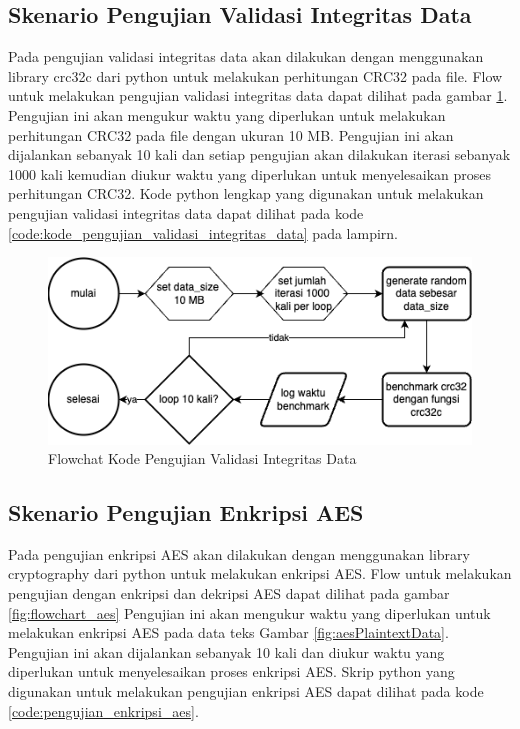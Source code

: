 \subsection{Skenario Pengujian Validasi Integritas Data}
Pada pengujian validasi integritas data akan dilakukan dengan menggunakan library crc32c dari python untuk melakukan perhitungan CRC32 pada file. Flow untuk melakukan pengujian validasi integritas data dapat dilihat pada gambar \ref{fig:flowchart_crc32}. Pengujian ini akan mengukur waktu yang diperlukan untuk melakukan perhitungan CRC32 pada file dengan ukuran 10 MB. Pengujian ini akan dijalankan sebanyak 10 kali dan setiap pengujian akan dilakukan iterasi sebanyak 1000 kali kemudian diukur waktu yang diperlukan untuk menyelesaikan proses perhitungan CRC32. Kode python lengkap yang digunakan untuk melakukan pengujian validasi integritas data dapat dilihat pada kode \ref{code:kode_pengujian_validasi_integritas_data} pada lampirn.

\begin{figure}
    \centering
    \includegraphics[width=1\textwidth]
    {assets/pics/code-flowchart/flowchart_crc32.png}
    \caption{Flowchat Kode Pengujian Validasi Integritas Data}
    \label{fig:flowchart_crc32}
\end{figure}

\subsection{Skenario Pengujian Enkripsi AES}
Pada pengujian enkripsi AES akan dilakukan dengan menggunakan library cryptography dari python untuk melakukan enkripsi AES. Flow untuk melakukan pengujian dengan enkripsi dan dekripsi AES dapat dilihat pada gambar \ref{fig:flowchart_aes} Pengujian ini akan mengukur waktu yang diperlukan untuk melakukan enkripsi AES pada data teks Gambar \ref{fig:aesPlaintextData}. Pengujian ini akan dijalankan sebanyak 10 kali dan diukur waktu yang diperlukan untuk menyelesaikan proses enkripsi AES. Skrip python yang digunakan untuk melakukan pengujian enkripsi AES dapat dilihat pada kode \ref{code:pengujian_enkripsi_aes}.

